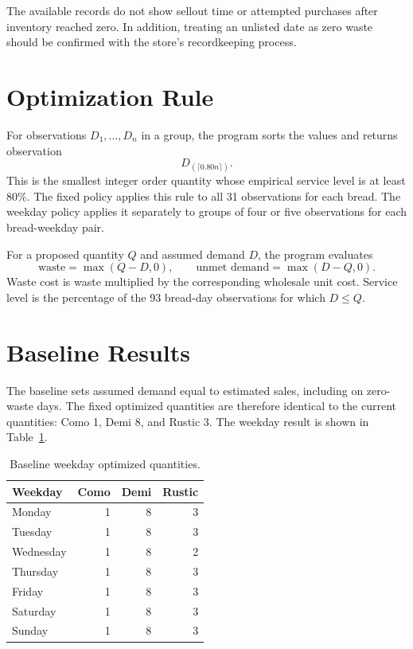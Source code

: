 \documentclass[11pt]{article}
\begin{document}
The available records do not show sellout time or attempted purchases after
inventory reached zero.  In addition, treating an unlisted date as zero waste
should be confirmed with the store's recordkeeping process.

\section{Optimization Rule}

For observations $D_1,\ldots,D_n$ in a group, the program sorts the values and
returns observation
\[
  D_{(\lceil 0.80n\rceil)}.
\]
This is the smallest integer order quantity whose empirical service level is
at least 80\%.  The fixed policy applies this rule to all 31 observations for
each bread.  The weekday policy applies it separately to groups of four or
five observations for each bread-weekday pair.

For a proposed quantity $Q$ and assumed demand $D$, the program evaluates
\[
  \text{waste}=\max(Q-D,0),\qquad
  \text{unmet demand}=\max(D-Q,0).
\]
Waste cost is waste multiplied by the corresponding wholesale unit cost.
Service level is the percentage of the 93 bread-day observations for which
$D\leq Q$.

\section{Baseline Results}

The baseline sets assumed demand equal to estimated sales, including on
zero-waste days.  The fixed optimized quantities are therefore identical to
the current quantities: Como 1, Demi 8, and Rustic 3.  The weekday result is
shown in Table~\ref{tab:schedule}.

\begin{table}[htbp]
\centering
\caption{Baseline weekday optimized quantities.}
\label{tab:schedule}
\begin{tabular}{@{}lrrr@{}}
\toprule
Weekday & Como & Demi & Rustic \\
\midrule
Monday    & 1 & 8 & 3 \\
Tuesday   & 1 & 8 & 3 \\
Wednesday & 1 & 8 & 2 \\
Thursday  & 1 & 8 & 3 \\
Friday    & 1 & 8 & 3 \\
Saturday  & 1 & 8 & 3 \\
Sunday    & 1 & 8 & 3 \\
\bottomrule
\end{tabular}
\end{table}
\end{document}
